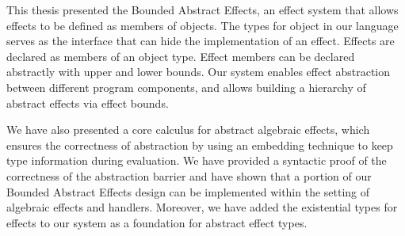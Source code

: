 This thesis presented the Bounded Abstract Effects, an effect system that allows effects to be defined as members of objects. The types for object in our language serves as the interface that can hide the implementation of an effect. Effects are declared as members of an object type. Effect members can be declared abstractly with upper and lower bounds. Our system enables effect abstraction between different program components, and allows building a hierarchy of abstract effects via effect bounds.

We have also presented a core calculus for abstract algebraic effects, which ensures the correctness of abstraction by using an embedding technique to keep type information during evaluation. We have provided a syntactic proof of the correctness of the abstraction barrier and have shown that a portion of our Bounded Abstract Effects design can be implemented within the setting of algebraic effects and handlers.  Moreover, we have added the existential types for effects to our system as a foundation for abstract effect types. 






